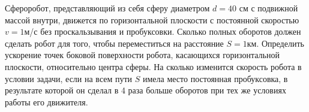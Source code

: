 
Сфероробот, представляющий из себя сферу диаметром $d=40$ см с подвижной массой внутри, движется по горизонтальной 
плоскости с постоянной скоростью $v=1$м/с без проскальзывания и пробуксовки. Сколько полных оборотов должен 
сделать робот для того, чтобы переместиться на расстояние $S=1$км. Определить ускорение точек боковой поверхности 
робота, касающихся горизонтальной плоскости, относительно центра сферы.  На сколько изменится скорость робота в 
условии задачи, если на всем пути $S$ имела место постоянная пробуксовка, в результате которой он сделал в 4 раза 
больше оборотов при тех же условиях работы его движителя.